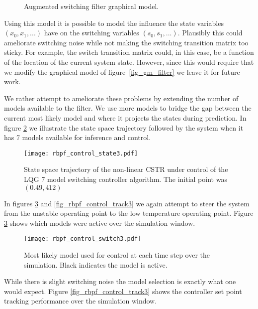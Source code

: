 \begin{enumerate}
\begin{figure}[H]
\caption{Augmented switching filter graphical model.}
\label{fig_gm_augmented}
\end{figure}
Using this model it is possible to model the influence the state variables $(x_0,x_1,...)$ have on the switching variables $(s_0, s_1,...)$. Plausibly this could ameliorate switching noise while not making the switching transition matrix too sticky. For example, the switch transition matrix could, in this case, be a function of the location of the current system state. However, since this would require that we modify the graphical model of figure~\ref{fig_gm_filter} we leave it for future work.
\end{enumerate}
We rather attempt to ameliorate these problems by extending the number of models available to the filter. We use more models to bridge the gap between the current most likely model and where it projects the states during prediction. In figure \ref{fig_rbpf_control_state3} we illustrate the state space trajectory followed by the system when it has 7 models available for inference and control.
\begin{figure}[H] 
\centering
\texttt{[image: rbpf\_control\_state3.pdf]}
\caption{State space trajectory of the non-linear CSTR under control of the LQG 7 model switching controller algorithm. The initial point was $(0.49, 412)$}
\label{fig_rbpf_control_state3}
\end{figure}
In figures \ref{fig_rbpf_control_switch3} and \ref{fig_rbpf_control_track3} we again attempt to steer the system from the unstable operating point to the low temperature operating point. Figure \ref{fig_rbpf_control_switch3} shows which models were active over the simulation window.
\begin{figure}[H] 
\centering
\texttt{[image: rbpf\_control\_switch3.pdf]}
\caption{Most likely model used for control at each time step over the simulation. Black indicates the model is active.}
\label{fig_rbpf_control_switch3}
\end{figure}
While there is slight switching noise the model selection is exactly what one would expect. Figure \ref{fig_rbpf_control_track3} shows the controller set point tracking performance over the simulation window.
